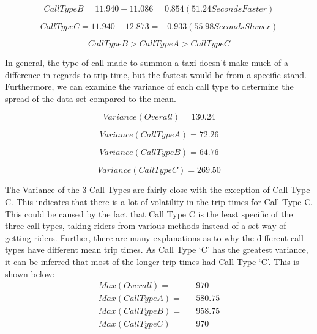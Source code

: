 \documentclass[11pt]{article}
\begin{document}
\begin{equation}
Call Type B = 11.940 - 11.086 = 0.854(51.24 Seconds Faster)
\end{equation}

\begin{equation}
Call Type C = 11.940 - 12.873 = -0.933 (55.98 Seconds Slower)
\end{equation}

\begin{equation}
Call Type B >Call Type A > Call Type C
\end{equation}

\par
In general, the type of call made to summon a taxi doesn’t make much of a difference in regards to trip time, but the fastest would be from a specific stand. Furthermore, we can examine the variance of each call type to determine the spread of the data set compared to the mean.

\begin{equation}
Variance (Overall) = 130.24
\end{equation}

\begin{equation}
Variance (Call Type A) = 72.26
\end{equation}

\begin{equation}
Variance (Call Type B) = 64.76
\end{equation}

\begin{equation}
Variance (Call Type C) = 269.50
\end{equation}

\par
The Variance of the 3 Call Types are fairly close with the exception of Call Type C. This indicates that there is a lot of volatility in the trip times for Call Type C. This could be caused by the fact that Call Type C is the least specific of the three call types, taking riders from various methods instead of a set way of getting riders. Further, there are many explanations as to why the different call types have different mean trip times. As Call Type ‘C’ has the greatest variance, it can be inferred that most of the longer trip times had Call Type ‘C’. This is shown below:
\begin{equation*}
	\begin{aligned}
		Max(Overall) =&& 970\\
Max(Call Type A) =&& 580.75\\
Max(Call Type B) =&& 958.75\\
Max(Call Type C) =&& 970
	\end{aligned}
\end{equation*}
\end{document}
